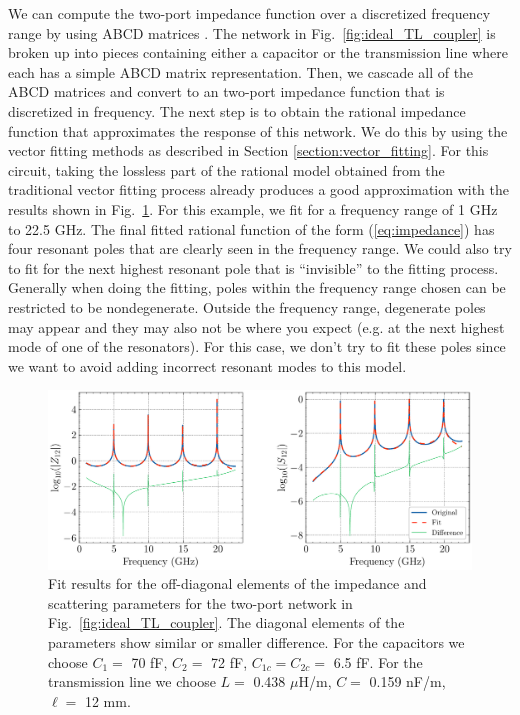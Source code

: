 We can compute the two-port impedance function over a discretized frequency range by using ABCD matrices \cite[Chapter 4.4]{Pozar_2011}. The network in Fig.\ \ref{fig:ideal_TL_coupler} is broken up into pieces containing either a capacitor or the transmission line where each has a simple ABCD matrix representation. Then, we cascade all of the ABCD matrices and convert to an two-port impedance function that is discretized in frequency. The next step is to obtain the rational impedance function that approximates the response of this network. We do this by using the vector fitting methods as described in Section \ref{section:vector_fitting}. For this circuit, taking the lossless part of the rational model obtained from the traditional vector fitting process already produces a good approximation with the results shown in Fig.\ \ref{fig:ideal_TL_coupler_fit}. For this example, we fit for a frequency range of 1 GHz to 22.5 GHz. The final fitted rational function of the form (\ref{eq:impedance}) has four resonant poles that are clearly seen in the frequency range. We could also try to fit for the next highest resonant pole that is ``invisible'' to the fitting process. Generally when doing the fitting, poles within the frequency range chosen can be restricted to be nondegenerate. Outside the frequency range, degenerate poles may appear and they may also not be where you expect (e.g. at the next highest mode of one of the resonators). For this case, we don't try to fit these poles since we want to avoid adding incorrect resonant modes to this model. 

\begin{figure}[!h]
    \centering
    \includegraphics[width=\textwidth]{figures/ideal_TL_fit.pdf}
    \caption{Fit results for the off-diagonal elements of the impedance and scattering parameters for the two-port network in Fig.\ \ref{fig:ideal_TL_coupler}. The diagonal elements of the parameters show similar or smaller difference. For the capacitors we choose $C_1 =$ 70 fF, $C_2 =$ 72 fF, $C_{1c}=C_{2c} =$ 6.5 fF. For the transmission line we choose $L = $ 0.438 $\mu$H/m, $C = $ 0.159 nF/m, $\ell =$ 12 mm.}
    \label{fig:ideal_TL_coupler_fit}
\end{figure}

